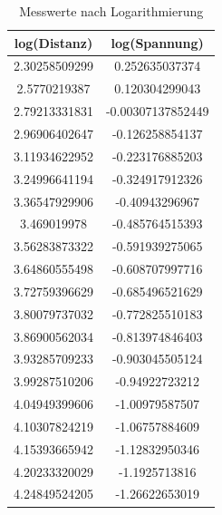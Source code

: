 \documentclass[12pt,oneside,a4paper]{report}
\begin{document}
\begin{table}[H]
	\centering\small
	\begin{tabular}{|c|c|}
		\hline
		log(Distanz) & log(Spannung) \\
		\hline
		2.30258509299 & 0.252635037374 \\
		\hline
		2.5770219387 & 0.120304299043 \\
		\hline
		2.79213331831 & -0.00307137852449 \\
		\hline
		2.96906402647 & -0.126258854137 \\
		\hline
		3.11934622952 & -0.223176885203 \\
		\hline
		3.24996641194 & -0.324917912326 \\
		\hline
		3.36547929906 & -0.40943296967 \\
		\hline
		3.469019978 & -0.485764515393 \\
		\hline
		3.56283873322 & -0.591939275065 \\
		\hline
		3.64860555498 & -0.608707997716 \\
		\hline
		3.72759396629 & -0.685496521629 \\
		\hline
		3.80079737032 & -0.772825510183 \\
		\hline
		3.86900562034 & -0.813974846403 \\
		\hline
		3.93285709233 & -0.903045505124 \\
		\hline
		3.99287510206 & -0.94922723212 \\
		\hline
		4.04949399606 & -1.00979587507 \\
		\hline
		4.10307824219 & -1.06757884609 \\
		\hline
		4.15393665942 & -1.12832950346 \\
		\hline
		4.20233320029 & -1.1925713816 \\
		\hline
		4.24849524205 & -1.26622653019 \\
		\hline
	\end{tabular}
	\caption{Messwerte nach Logarithmierung}
	\label{fig:VERSUCH_2_MESSWERTE_TABELLE}
\end{table}
\end{document}
